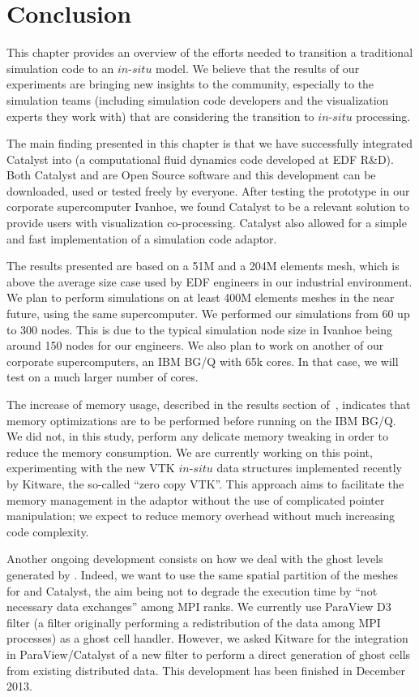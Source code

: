 \section{Conclusion}
\label{sec:conclusion}

This chapter provides an overview of the efforts needed to transition
a traditional simulation code to an $in$-$situ$ model.  We believe that the
results of our experiments are bringing new insights to the
community, especially to the simulation teams (including simulation code
developers and the visualization experts they work with) that are
considering the transition to $in$-$situ$ processing.

The main finding presented in this chapter is that we have successfully
integrated Catalyst into \CS (a computational fluid dynamics code
developed at EDF R\&D). Both Catalyst and \CS are Open Source software
and this development can be downloaded, used or tested freely by everyone. After
testing the prototype in our corporate supercomputer Ivanhoe, we found Catalyst to
be a relevant solution to provide \CS users with visualization
co-processing. Catalyst also allowed for a simple and fast implementation of a simulation code
adaptor.

The results presented are based on a 51M and a 204M elements mesh, which is
above the average size case used by EDF engineers in our industrial environment.
We plan to perform simulations on at least 400M elements meshes in the near
future, using the same supercomputer. We performed our simulations from 60 up to
300 nodes. This is due to the typical simulation node size in Ivanhoe being around 150 nodes for our 
engineers. We also plan to work on another of our corporate supercomputers, an
IBM BG/Q with 65k cores. In that case, we will test on a much larger number of
cores.

The increase of memory usage, described in the results section of~\cite{6675158}, indicates that
memory optimizations are to be performed before running on the IBM BG/Q. We did
not, in this study, perform any delicate memory tweaking in order to reduce the
memory consumption. We are currently working on this point, experimenting with
the new VTK $in$-$situ$ data structures implemented recently by Kitware, the
so-called ``zero copy VTK''. This approach aims to facilitate the memory
management in the adaptor without the use of complicated pointer manipulation;
we expect to reduce memory overhead without much increasing code complexity.

Another ongoing development consists on how we deal with the ghost levels
generated by \CS. Indeed, we want to use the same spatial partition
of the meshes for \CS and Catalyst, the aim being not to degrade
the execution time by “not necessary data exchanges” among MPI ranks. We
currently use ParaView D3 filter (a filter originally performing a
redistribution of the data among MPI processes) as a ghost cell handler.
However,
we asked Kitware for the integration in ParaView/Catalyst of a new filter to
perform a direct generation of ghost cells from existing distributed data. This
development has been finished in December 2013.

